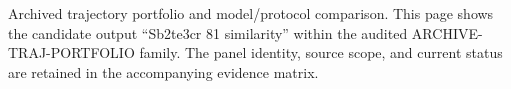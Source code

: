 Archived trajectory portfolio and model/protocol comparison. This page shows the candidate output ``Sb2te3cr 81 similarity'' within the audited ARCHIVE-TRAJ-PORTFOLIO family. The panel identity, source scope, and current status are retained in the accompanying evidence matrix.
